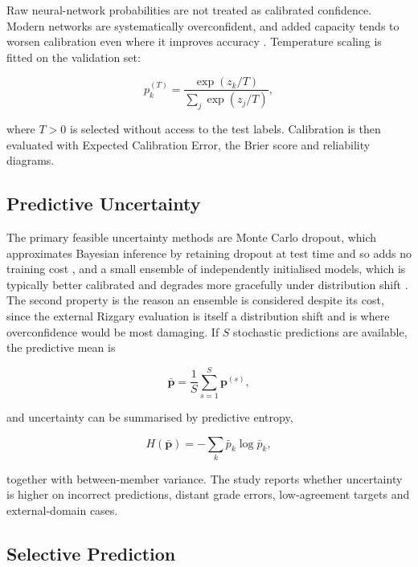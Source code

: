 Raw neural-network probabilities are not treated as calibrated confidence.
Modern networks are systematically overconfident, and added capacity tends to
worsen calibration even where it improves accuracy \cite{guo2017calibration}.
Temperature scaling is fitted on the validation set:

\begin{equation}
p_k^{(T)}
=
\frac{
\exp(z_k/T)
}{
\sum_j \exp(z_j/T)
},
\label{eq:temperature}
\end{equation}

where $T>0$ is selected without access to the test labels. Calibration is then
evaluated with Expected Calibration Error, the Brier score
\cite{brier1950verification} and reliability diagrams.

\subsection{Predictive Uncertainty}
\label{sec:method-uncertainty}

The primary feasible uncertainty methods are Monte Carlo dropout, which
approximates Bayesian inference by retaining dropout at test time and so adds no
training cost \cite{gal2016dropout}, and a small ensemble of independently
initialised models, which is typically better calibrated and degrades more
gracefully under distribution shift \cite{lakshminarayanan2017simple}. The
second property is the reason an ensemble is considered despite its cost, since
the external Rizgary evaluation is itself a distribution shift and is where
overconfidence would be most damaging. If $S$ stochastic predictions are
available, the predictive mean is

\begin{equation}
\bar{\mathbf{p}}
=
\frac{1}{S}\sum_{s=1}^{S}\mathbf{p}^{(s)},
\label{eq:predictive-mean}
\end{equation}

and uncertainty can be summarised by predictive entropy,

\begin{equation}
H(\bar{\mathbf{p}})
=
-\sum_k \bar{p}_k\log\bar{p}_k,
\label{eq:entropy}
\end{equation}

together with between-member variance. The study reports whether uncertainty is
higher on incorrect predictions, distant grade errors, low-agreement targets
and external-domain cases.

\subsection{Selective Prediction}
\label{sec:method-selective}

